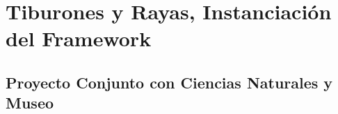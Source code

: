 \chapter{Tiburones y Rayas, Instanciación del Framework}

\section{Proyecto Conjunto con Ciencias Naturales y Museo}
